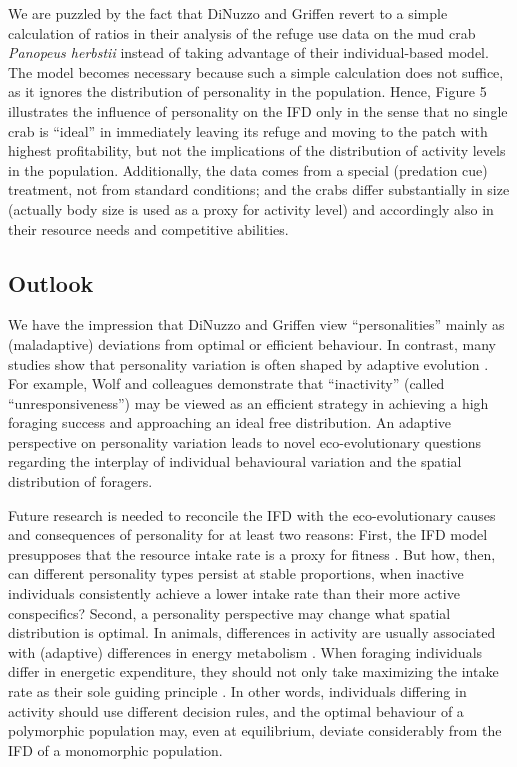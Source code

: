 \begin{interludeenv}
	We are puzzled by the fact that DiNuzzo and Griffen revert to a simple calculation of ratios in their analysis of the refuge use data on the mud crab \textit{Panopeus herbstii}  instead of taking advantage of their individual-based model.
	The model becomes necessary because such a simple calculation does not suffice, as it ignores the distribution of personality in the population.
	Hence, Figure 5 illustrates the influence of personality on the IFD only in the sense that no single crab is ``ideal'' in immediately leaving its refuge and moving to the patch with highest profitability, but not the implications of the distribution of activity levels in the population.
	Additionally, the data comes from a special (predation cue) treatment, not from standard conditions; and the crabs differ substantially in size (actually body size is used as a proxy for activity level) and accordingly also in their resource needs and competitive abilities. 
	
	\subsection*{Outlook}
	
	We have the impression that DiNuzzo and Griffen view ``personalities'' mainly as (maladaptive) deviations from optimal or efficient behaviour. In contrast, many studies show that personality variation is often shaped by adaptive evolution .
	For example, Wolf and colleagues demonstrate that “inactivity” (called ``unresponsiveness'') may be viewed as an efficient strategy in achieving a high foraging success and approaching an ideal free distribution.
	An adaptive perspective on personality variation leads to novel eco-evolutionary questions regarding the interplay of individual behavioural variation and the spatial distribution of foragers.

	Future research is needed to reconcile the IFD with the eco-evolutionary causes and consequences of personality for at least two reasons: First, the IFD model presupposes that the resource intake rate is a proxy for fitness .
	But how, then, can different personality types persist at stable proportions, when inactive individuals consistently achieve a lower intake rate than their more active conspecifics? 
	Second, a personality perspective may change what spatial distribution is optimal.
	In animals, differences in activity are usually associated with (adaptive) differences in energy metabolism .
	When foraging individuals differ in energetic expenditure, they should not only take maximizing the intake rate as their sole guiding principle .
	In other words, individuals differing in activity should use different decision rules, and the optimal behaviour of a polymorphic population may, even at equilibrium, deviate considerably from the IFD of a monomorphic population.


\end{interludeenv}
